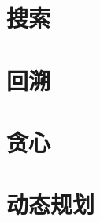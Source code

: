 \documentclass[oneside]{book}
\begin{document}
\begin{CJK}{UTF8}{gbsn}
%

\chapter{搜索}


\chapter{回溯}


\chapter{贪心}


\chapter{动态规划}


%


\end{CJK}
\end{document}
